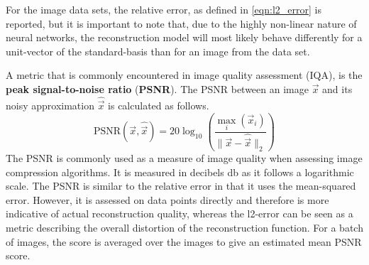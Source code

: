 
For the image data sets, the relative
error, as defined in \ref{eqn:l2_error} is reported, but it is important to
note that, due to the highly non-linear nature of neural networks, 
the reconstruction model will most likely behave differently for a unit-vector 
of the standard-basis than for an image from the data set.

A metric that is commonly encountered in image quality assessment (IQA), is the 
\textbf{peak signal-to-noise ratio} (\textbf{PSNR}).
The PSNR between an image $\vec x$ and its noisy approximation $\hat {\vec x}$ 
is calculated as follows.
\[
    \text{PSNR}(\vec x, \hat {\vec x}) = 20 \log_{10} \left (\frac {\max_i(\vec x_i)} {\|\vec x-\hat {\vec x}\|_2} \right )
\]
The PSNR is commonly used as a measure of image quality 
when assessing image compression algorithms. 
It is measured in decibels db as it follows a logarithmic scale.
The PSNR is similar to the relative error in that it uses the mean-squared error. 
However, it is assessed on data points directly and therefore is more indicative of actual 
reconstruction quality, whereas the l2-error can be seen as a metric describing the 
overall distortion of the reconstruction function.
For a batch of images, the score is averaged over the images to give an estimated mean PSNR score.

